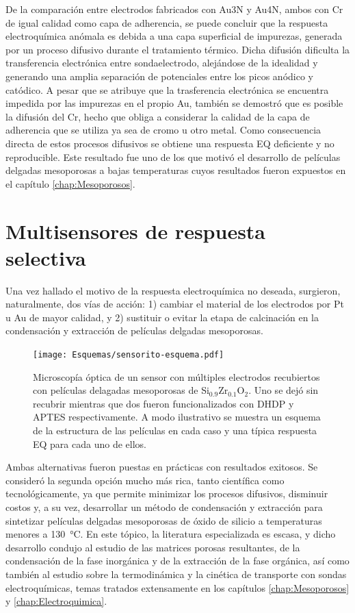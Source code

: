 		    De la comparación entre electrodos fabricados con Au3N y Au4N, ambos con Cr de igual calidad como capa de adherencia, se puede concluir que la respuesta electroquímica anómala es debida a una capa superficial de impurezas, generada por un proceso difusivo durante el tratamiento térmico. Dicha difusión dificulta la transferencia electrónica entre sonda\textbar electrodo, alejándose de la idealidad y generando una amplia separación de potenciales entre los picos anódico y catódico. A pesar que se atribuye que la trasferencia electrónica se encuentra impedida por las impurezas en el propio Au, también se demostró que es posible la difusión del Cr, hecho que obliga a considerar la calidad de la capa de adherencia que se utiliza ya sea de cromo u otro metal. Como consecuencia directa de estos procesos difusivos se obtiene una respuesta EQ deficiente y no reproducible. Este resultado fue uno de los que motivó el desarrollo de películas delgadas mesoporosas a bajas temperaturas cuyos resultados fueron expuestos en el capítulo \ref{chap:Mesoporosos}.

\section{Multisensores de respuesta selectiva}

			Una vez hallado el motivo de la respuesta electroquímica no deseada, surgieron, naturalmente, dos vías de acción: 1) cambiar el material de los electrodos por Pt u Au de mayor calidad, y 2) sustituir o evitar la etapa de calcinación en la condensación y extracción de películas delgadas mesoporosas.

				\begin{figure}[b!]
		 	       	\begin{center}
		 	       	\texttt{[image: Esquemas/sensorito-esquema.pdf]}
		        	\caption[Esquema de sensores EQ selectivos]{Microscopía óptica de un sensor con múltiples electrodos recubiertos con películas delagadas mesoporosas de Si$_{0.9}$Zr$_{0.1}$O$_2$. Uno se dejó sin recubrir mientras que dos fueron funcionalizados con DHDP y APTES respectivamente. A modo ilustrativo se muestra un esquema de la estructura de las películas en cada caso y una típica respuesta EQ para cada uno de ellos.}
		         	\label{fig:sensor-calesita}
		         	\end{center}
		     		\end{figure}

			Ambas alternativas fueron puestas en prácticas con resultados exitosos. Se consideró la segunda opción mucho más rica, tanto científica como tecnológicamente, ya que permite minimizar los procesos difusivos, disminuir costos y, a su vez, desarrollar un método de condensación y extracción para sintetizar películas delgadas mesoporosas de óxido de silicio a temperaturas menores a \SI{130}{\celsius}. En este tópico, la literatura especializada es escasa, y dicho desarrollo condujo al estudio de las matrices porosas resultantes, de la condensación de la fase inorgánica y de la extracción de la fase orgánica, así como también al estudio sobre la termodinámica y la cinética de transporte con sondas electroquímicas, temas tratados extensamente en los capítulos  \ref{chap:Mesoporosos} y \ref{chap:Electroquimica}. 

